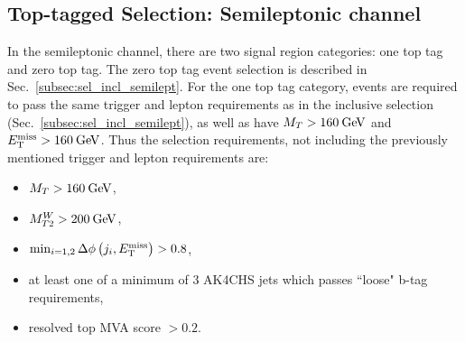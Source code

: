 \subsection{Top-tagged Selection: Semileptonic channel}
\label{subsec:sel_toptag_semilept}

In the semileptonic channel, there are two signal region categories: one top tag and zero top tag. The zero top tag event selection is described in Sec.~\ref{subsec:sel_incl_semilept}. For the one top tag category, events are required to pass the same trigger and lepton requirements as in the inclusive selection (Sec.~\ref{subsec:sel_incl_semilept}), as well as have $M_{T}>160\:\mathrm{Ge\kern -0.1em V}$ and $E_\mathrm{T}^{\mathrm{miss}}>160\:\mathrm{Ge\kern -0.1em V}$. Thus the selection requirements, not including the previously mentioned trigger and lepton requirements are:

\begin{itemize}
\item $M_{T}>160\:\mathrm{Ge\kern -0.1em V}$,
\item$M_{T2}^W > 200\:\mathrm{Ge\kern -0.1em V}$,
\item$\min_{i=1,2}\Delta\phi\left(j_i,E_\mathrm{T}^{\mathrm{miss}}\right)>0.8$,
\item at least one of a minimum of 3 AK4CHS jets which passes ``loose" b-tag requirements,
\item resolved top MVA score $> 0.2$.
\end{itemize}


